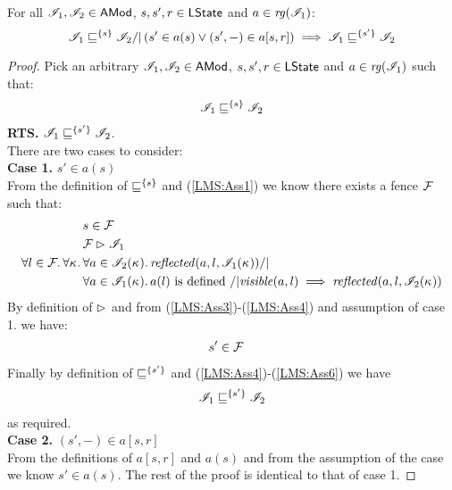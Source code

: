 \begin{lemma}\label{lem:shift-fence}
For all $\mathscr{I}_1, \mathscr{I}_2 \in \textsf{AMod}$, $s, s', r \in \textsf{LState}$ and $a \in \mathit{rg}(\mathscr{I}_1)$:
%
\[
	\mathscr{I}_1 \sqsubseteq^{\{s\}} \mathscr{I}_2 /| \left(s' \in a(s) \lor (s', -) \in a[s, r] \right) \implies \mathscr{I}_1 \sqsubseteq^{\{s'\}} \mathscr{I}_2
\]
%
\begin{proof}
Pick an arbitrary $\mathscr{I}_1, \mathscr{I}_2 \in \textsf{AMod}$, $s, s', r \in \textsf{LState}$ and $a \in \mathit{rg}(\mathscr{I}_1)$ such that:
%
\begin{align}
	\mathscr{I}_1 \sqsubseteq^{\{s\}} \mathscr{I}_2 \label{LMS:Ass1}
\end{align}
\textbf{RTS. } $\mathscr{I}_1 \sqsubseteq^{\{s'\}} \mathscr{I}_2$.\\
There are two cases to consider:\\
\textbf{Case 1. }$s' \in a(s)$\\
From the definition of $\sqsubseteq^{\{s\}}$ and (\ref{LMS:Ass1}) we know there exists a fence $\mathcal{F}_{}$ such that:
%
\begin{align}
	& s \in \fence{} \label{LMS:Ass3}\\
	& \fence{} \fences \lmod_1 \label{LMS:Ass4}\\
	\for{l \in \fence{}} \for{\ca{}}& \for{a \in \lmod_2(\ca{})} \m{reflected}(a, l, \lmod_1(\ca{})) /| \null \nonumber\\
	& \for{a \in \lmod_1(\ca{})} a(l) \text{ is defined } /| \m{visible}(a, l) \implies \m{reflected}(a, l, \lmod_2(\ca{})) \label{LMS:Ass5}
\end{align}
By definition of $\mathrel{\rhd}$ and from (\ref{LMS:Ass3})-(\ref{LMS:Ass4}) and assumption of case 1. we have: 
%
\begin{align}
	& s' \in \mathcal{F}_{} \label{LMS:Ass6}
\end{align}
%
Finally by definition of $\sqsubseteq^{\{s'\}}$ and (\ref{LMS:Ass4})-(\ref{LMS:Ass6}) we have
%
\begin{align*}
	\mathscr{I}_1 \sqsubseteq^{\{s'\}} \mathscr{I}_2
\end{align*}
%
as required.\\

\noindent\textbf{Case 2. }$(s', -) \in a[s, r]$\\
%
From the definitions of $a[s, r]$ and $a(s)$ and from the assumption of the case we know $s' \in a(s)$. The rest of the proof is identical to that of case 1.
\end{proof}
\end{lemma}
